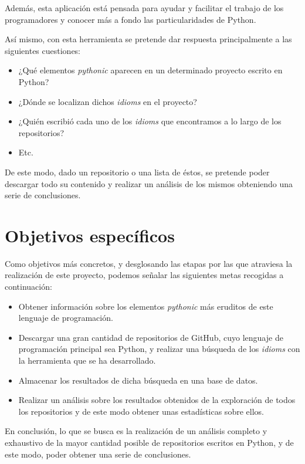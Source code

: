 \documentclass[a4paper, 12pt]{book}
\begin{document}
Además, esta aplicación está pensada para ayudar y facilitar el trabajo de los programadores y conocer más a fondo las particularidades de Python.

Así mismo, con esta herramienta se pretende dar respuesta principalmente a las siguientes cuestiones:
\begin{itemize}
\item ¿Qué elementos \textit{pythonic} aparecen en un determinado proyecto escrito en Python?
\item ¿Dónde se localizan dichos \textit{idioms} en el proyecto?
\item ¿Quién escribió cada uno de los \textit{idioms} que encontramos a lo largo de los repositorios?
\item Etc.
\end{itemize}

De este modo, dado un repositorio o una lista de éstos, se pretende poder descargar todo su contenido y realizar un análisis de los mismos obteniendo una serie de conclusiones.



\section{Objetivos específicos}
Como objetivos más concretos, y desglosando las etapas por las que atraviesa la realización de este proyecto, podemos señalar las siguientes metas recogidas a continuación:


\begin{itemize}

\item Obtener información sobre los elementos \textit{pythonic} más eruditos de este lenguaje de programación.

\item Descargar una gran cantidad de repositorios de GitHub, cuyo lenguaje de programación principal sea Python, y realizar una búsqueda de los \textit{idioms} con la herramienta que se ha desarrollado.

\item Almacenar los resultados de dicha búsqueda en una base de datos.

\item Realizar un análisis sobre los resultados obtenidos de la exploración de todos los repositorios y de este modo obtener unas estadísticas sobre ellos.

\end{itemize}

En conclusión, lo que se busca es la realización de un análisis completo y exhaustivo de la mayor cantidad posible de repositorios escritos en Python, y de este modo, poder obtener una serie de conclusiones.
\end{document}
